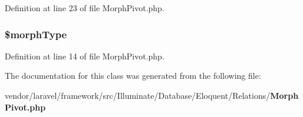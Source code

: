Definition at line 23 of file Morph\+Pivot.\+php.

\subsubsection[{\$morph\+Type}]{\setlength{\rightskip}{0pt plus 5cm}\$morph\+Type\hspace{0.3cm}{\ttfamily [protected]}}\label{class_illuminate_1_1_database_1_1_eloquent_1_1_relations_1_1_morph_pivot_a360c5e4b8e71ab470bf958957a6f741a}


Definition at line 14 of file Morph\+Pivot.\+php.



The documentation for this class was generated from the following file\+:\begin{DoxyCompactItemize}
\item 
vendor/laravel/framework/src/\+Illuminate/\+Database/\+Eloquent/\+Relations/{\bf Morph\+Pivot.\+php}\end{DoxyCompactItemize}
